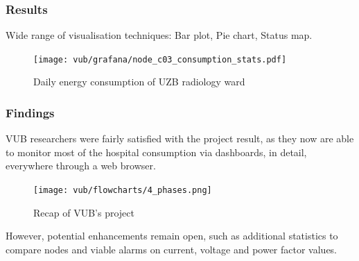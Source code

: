 \begin{frame}
    \frametitle{Results}
    \vspace*{\fill}
    Wide range of visualisation techniques: Bar plot, Pie chart, Status map.

    \begin{figure}
        \texttt{[image: vub/grafana/node\_c03\_consumption\_stats.pdf]}
        \caption{Daily energy consumption of \acs{UZB} radiology ward}
    \end{figure}
    \vspace*{\fill}
\end{frame}

\begin{frame}
    \frametitle{Findings}
    \vspace*{\fill}
    
    VUB researchers were fairly satisfied with
    the project result, as they now are able to monitor most of the hospital
    consumption via dashboards, in detail, everywhere through a web browser.
    \begin{figure}[ht]
        \texttt{[image: vub/flowcharts/4\_phases.png]}
        \caption{Recap of \acs{VUB}'s project}
    \end{figure}
    However, potential enhancements remain open, such as additional statistics
    to compare nodes and viable alarms on current, voltage and power factor
    values.

    \vspace*{\fill}
\end{frame}